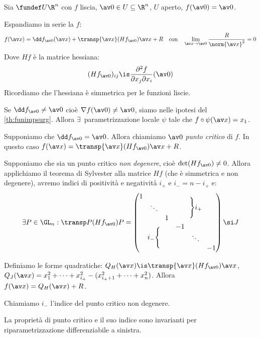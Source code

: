 Sia $\fundef U{\R^n}$ con $f$ liscia, $\av 0\in U\subseteq\R^n$, $U$ aperto, $f(\av0)=\av0$.

Espandiamo in serie la $f$:
\[f(\av x)=
\dd f_{\av0}(\av x)+\transp{\av x}(Hf_{\av0})\av x+R
\quad\text{con}\quad
\lim_{\av x\to\av0}\frac R{\norm{\av x}^2}=0\]
Dove $Hf$ è la matrice hessiana:
\[(Hf_{\av0})_{ij}\is
\frac{\partial^2f}{\partial x_j\partial x_i}(\av0)\]
Ricordiamo che l'hessiana è simmetrica per le funzioni liscie.

Se $\dd f_{\av0}\neq\av0$ cioè $\nabla f(\av0)\neq\av0$, siamo nelle ipotesi del \autoref{th:funimpsurg}. Allora $\exists$~parametrizzazione locale $\psi$ tale che $f\circ\psi(\av x)=x_1$.

Supponiamo che $\dd f_{\av0}=\av0$. Allora chiamiamo $\av0$ \emph{punto critico} di $f$. In questo caso $f(\av x)=\transp{\av x}(Hf_{\av0})\av x+R$.

Supponiamo che sia un punto critico \emph{non degenere}, cioè $\det(Hf_{\av0})\neq0$. Allora applichiamo il teorema di Sylvester alla matrice $Hf$ (che è simmetrica e non degenere), avremo indici di positività e negatività $i_+$ e $i_-=n-i_+$ e:
\[\exists P\in\GL_n:
\transp P(Hf_{\av0})P=
\begin{pmatrix}
	\begin{matrix}
		1 & & \\
		& \ddots & \\
		& & 1 \\
	\end{matrix} & \Bigg\}i_+ \\
	i_-\Bigg\{ & \begin{matrix}
		-1 & & \\
		& \ddots & \\
		& & -1 \\
	\end{matrix}
\end{pmatrix}\si J\]

Definiamo le forme quadratiche: $Q_H(\av x)\is\transp{\av x}(Hf_{\av0})\av x$, $Q_J(\av x)=x_1^2+\dots+x_{i_+}^2-(x_{i_++1}^2+\dots+x_n^2)$. Allora $f(\av x)=Q_H(\av x)+R$.

Chiamiamo $i_-$ l'indice del punto critico non degenere.

\begin{ex}
	La proprietà di punto critico e il suo indice sono invarianti per riparametrizzazione differenziabile a sinistra.
\end{ex}

